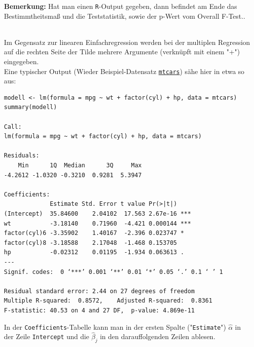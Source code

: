 \documentclass[a4paper]{article}
\newcommand\dangersign[1][2ex]{%
  \renewcommand\stacktype{L}%
  \scaleto{\stackon[1.3pt]{\color{red}$\triangle$}{\tiny !}}{#1}%
}
\begin{document}
\noindent \dangersign[3ex] \textbf{Bemerkung:} Hat man einen \texttt{R}-Output gegeben, dann befindet am Ende das Bestimmtheitsmaß und die Teststatistik, sowie der p-Wert vom Overall F-Test..\\

\clearpage

\noindent {}\\

\noindent \dangersign[3ex] Im Gegensatz zur linearen Einfachregression werden bei der multiplen Regression auf die rechten Seite der Tilde mehrere Argumente (verknüpft mit einem "+") eingegeben.\\

\noindent Eine typischer Output (Wieder Beispiel-Datensatz \href{https://www.rdocumentation.org/packages/datasets/versions/3.6.2/topics/mtcars}{\texttt{mtcars}}) sähe hier in etwa so aus:

\begin{small}
\begin{Verbatim}[frame=single]
modell <- lm(formula = mpg ~ wt + factor(cyl) + hp, data = mtcars)
summary(modell)

Call:
lm(formula = mpg ~ wt + factor(cyl) + hp, data = mtcars)

Residuals:
    Min      1Q  Median      3Q     Max 
-4.2612 -1.0320 -0.3210  0.9281  5.3947 

Coefficients:
             Estimate Std. Error t value Pr(>|t|)    
(Intercept)  35.84600    2.04102  17.563 2.67e-16 ***
wt           -3.18140    0.71960  -4.421 0.000144 ***
factor(cyl)6 -3.35902    1.40167  -2.396 0.023747 *  
factor(cyl)8 -3.18588    2.17048  -1.468 0.153705    
hp           -0.02312    0.01195  -1.934 0.063613 .  
---
Signif. codes:  0 ‘***’ 0.001 ‘**’ 0.01 ‘*’ 0.05 ‘.’ 0.1 ‘ ’ 1

Residual standard error: 2.44 on 27 degrees of freedom
Multiple R-squared:  0.8572,	Adjusted R-squared:  0.8361 
F-statistic: 40.53 on 4 and 27 DF,  p-value: 4.869e-11
\end{Verbatim}
\end{small}
In der \texttt{Coefficients}-Tabelle kann man in der ersten Spalte ("\texttt{Estimate}") $\hat \alpha$ in der Zeile \texttt{Intercept} und die $\hat \beta_j$ in den darauffolgenden Zeilen ablesen.\\
\end{document}
